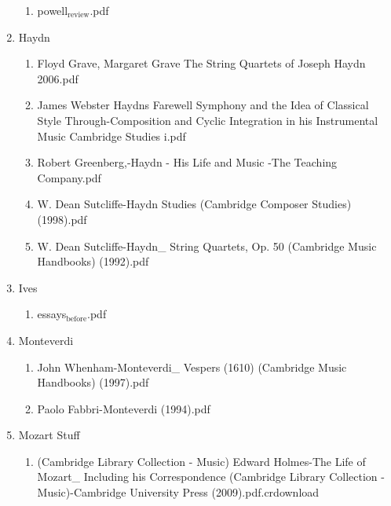 \documentclass[11pt]{article}
\begin{document}
\begin{enumerate}
\begin{enumerate}
\item powell$_{\text{review}}$.pdf
\label{sec-1-1-1-1-31-7-9-2}
\end{enumerate}

\item Haydn
\label{sec-1-1-1-1-31-7-10}
\begin{enumerate}
\item Floyd Grave, Margaret Grave The String Quartets of Joseph Haydn  2006.pdf
\label{sec-1-1-1-1-31-7-10-1}

\item James Webster Haydns Farewell Symphony and the Idea of Classical Style Through-Composition and Cyclic Integration in his Instrumental Music Cambridge Studies i.pdf
\label{sec-1-1-1-1-31-7-10-2}

\item Robert Greenberg,-Haydn - His Life and Music  -The Teaching Company.pdf
\label{sec-1-1-1-1-31-7-10-3}

\item W. Dean Sutcliffe-Haydn Studies (Cambridge Composer Studies) (1998).pdf
\label{sec-1-1-1-1-31-7-10-4}

\item W. Dean Sutcliffe-Haydn\_ String Quartets, Op. 50 (Cambridge Music Handbooks) (1992).pdf
\label{sec-1-1-1-1-31-7-10-5}
\end{enumerate}

\item Ives
\label{sec-1-1-1-1-31-7-11}
\begin{enumerate}
\item essays$_{\text{before}}$.pdf
\label{sec-1-1-1-1-31-7-11-1}
\end{enumerate}

\item Monteverdi
\label{sec-1-1-1-1-31-7-12}
\begin{enumerate}
\item John Whenham-Monteverdi\_ Vespers (1610) (Cambridge Music Handbooks) (1997).pdf
\label{sec-1-1-1-1-31-7-12-1}

\item Paolo Fabbri-Monteverdi (1994).pdf
\label{sec-1-1-1-1-31-7-12-2}
\end{enumerate}

\item Mozart Stuff
\label{sec-1-1-1-1-31-7-13}
\begin{enumerate}
\item (Cambridge Library Collection - Music) Edward Holmes-The Life of Mozart\_ Including his Correspondence (Cambridge Library Collection - Music)-Cambridge University Press (2009).pdf.crdownload
\label{sec-1-1-1-1-31-7-13-1}


\end{enumerate}
\end{enumerate}
\end{document}

